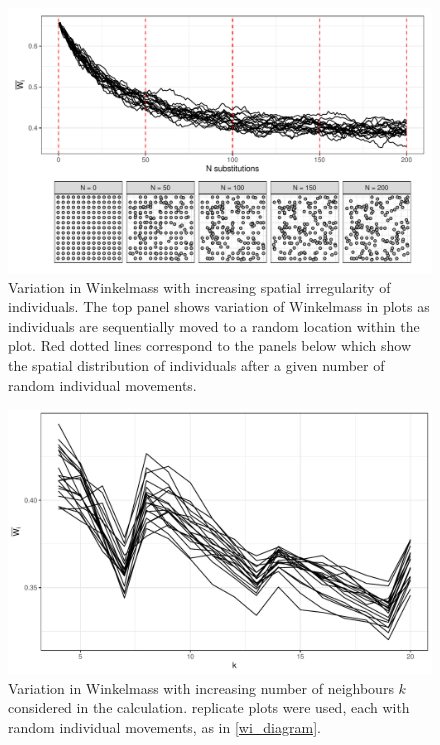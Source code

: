 \documentclass[11pt,a4paper]{article}
\begin{document}
\begin{figure}[H]
\centering
	\includegraphics[width=\textwidth]{wi_diagram}
	\caption{Variation in Winkelmass with increasing spatial irregularity of individuals. The top panel shows variation of Winkelmass in \wireps{} plots as individuals are sequentially moved to a random location within the plot. Red dotted lines correspond to the panels below which show the spatial distribution of individuals after a given number of random individual movements.}
	\label{wi_diagram}
\end{figure}

\begin{figure}[H]
\centering
	\includegraphics[width=\textwidth]{wi_k}
	\caption{Variation in Winkelmass with increasing number of neighbours $k$ considered in the calculation. \wireps{} replicate plots were used, each with \wistart{} random individual movements, as in \autoref{wi_diagram}.}
	\label{wi_k}
\end{figure}
\end{document}
